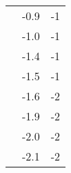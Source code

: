 \documentclass[10pt,letterpaper,twocolumn,twosided]{article}
\begin{document}
\begin{center}
\begin{tabular}{| c | c | c | }
                                         & -0.9  & -1 \\ \cline{2-3}
                                         & -1.0 & -1 \\ \cline{2-3}
                                         & -1.4 & -1 \\ \cline{2-3}
                                         & -1.5 & -1 \\ \cline{2-3}
                                         & -1.6 & -2 \\ \cline{2-3}
                                         & -1.9 & -2 \\ \cline{2-3}
                                         & -2.0 & -2 \\ \cline{2-3}
                                         & -2.1 & -2 \\ \cline{2-3}
    \hline
  \end{tabular}
  \renewcommand{\arraystretch}{1}
\end{center}
\end{document}
